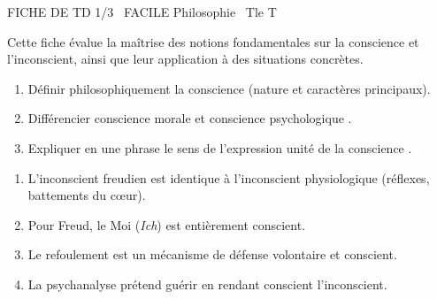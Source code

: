 \documentclass[11pt]{article}
\begin{document}
\begin{tcolorbox}[enhanced,colback=popink,colframe=popink,arc=10pt,boxrule=0pt,left=12pt,right=12pt,top=9pt,bottom=9pt]
{\color{white}\popxbold\small FICHE DE TD 1/3 \textbullet\ FACILE \hfill Philosophie \textbullet\ Tle T\par}
\end{tcolorbox}
\vspace{4pt}
\noindent Cette fiche évalue la maîtrise des notions fondamentales sur la conscience et l'inconscient, ainsi que leur application à des situations concrètes.

\begin{exercice}
\begin{enumerate}
    \item Définir philosophiquement la conscience (nature et caractères principaux).
    \item Différencier \og conscience morale \fg{} et \og conscience psychologique \fg{}.
    \item Expliquer en une phrase le sens de l'expression \og unité de la conscience \fg{}.
\end{enumerate}
\end{exercice}

\begin{exercice}
\begin{enumerate}
    \item L'inconscient freudien est identique à l'inconscient physiologique (réflexes, battements du cœur).
    \item Pour Freud, le \og Moi \fg{} (\textit{Ich}) est entièrement conscient.
    \item Le refoulement est un mécanisme de défense volontaire et conscient.
    \item La psychanalyse prétend guérir en rendant conscient l'inconscient.
\end{enumerate}
\end{exercice}
\end{document}
